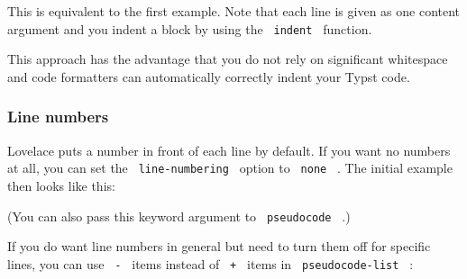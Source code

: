 This is equivalent to the first example. Note that each line is given as
one content argument and you indent a block by using the
\texttt{\ indent\ } function.

This approach has the advantage that you do not rely on significant
whitespace and code formatters can automatically correctly indent your
Typst code.

\subsubsection{Line numbers}\label{line-numbers}

Lovelace puts a number in front of each line by default. If you want no
numbers at all, you can set the \texttt{\ line-numbering\ } option to
\texttt{\ none\ } . The initial example then looks like this:

\begin{Shaded}
\begin{Highlighting}[]
\NormalTok{\#pseudocode{-}list(line{-}numbering: none)[}
\NormalTok{]}
\end{Highlighting}
\end{Shaded}

\pandocbounded{}

(You can also pass this keyword argument to \texttt{\ pseudocode\ } .)

If you do want line numbers in general but need to turn them off for
specific lines, you can use \texttt{\ -\ } items instead of
\texttt{\ +\ } items in \texttt{\ pseudocode-list\ } :

\begin{Shaded}
\begin{Highlighting}[]
\NormalTok{\#pseudocode{-}list[}
\NormalTok{]}
\end{Highlighting}
\end{Shaded}

\pandocbounded{}

